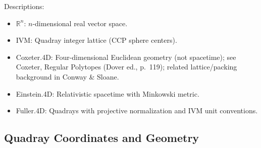 \documentclass[
  10pt,
]{article}
\providecommand{\tightlist}{%
  \setlength{\itemsep}{0pt}\setlength{\parskip}{0pt}}
\begin{document}
Descriptions:

\begin{itemize}
\tightlist
\item
  \(\mathbb{R}^n\): \(n\)-dimensional real vector space.
\item
  IVM: Quadray integer lattice (CCP sphere centers).
\item
  Coxeter.4D: Four-dimensional Euclidean geometry (not spacetime); see
  Coxeter, Regular Polytopes (Dover ed., p.~119); related
  lattice/packing background in Conway \& Sloane.
\item
  Einstein.4D: Relativistic spacetime with Minkowski metric.
\item
  Fuller.4D: Quadrays with projective normalization and IVM unit
  conventions.
\end{itemize}

\hypertarget{quadray-coordinates-and-geometry}{%
\subsection{Quadray Coordinates and
Geometry}\label{quadray-coordinates-and-geometry}}
\end{document}
